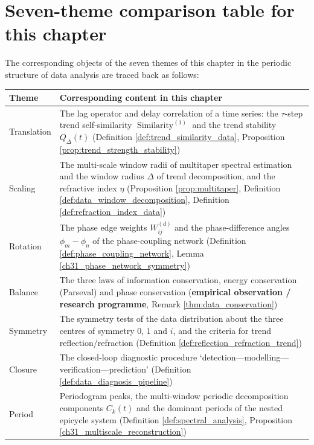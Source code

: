 \section*{Seven-theme comparison table for this chapter}
The corresponding objects of the seven themes of this chapter in the periodic structure of data analysis are traced back as follows:
\begin{center}
\begin{tabular}{>{\centering\arraybackslash}p{2.8cm}>{\centering\arraybackslash}p{8.9cm}}
\toprule
Theme & Corresponding content in this chapter \\
\midrule
Translation & The lag operator and delay correlation of a time series: the $\tau$-step trend self-similarity $\operatorname{Similarity}^{(1)}$ and the trend stability $Q_\Delta(t)$ (Definition \ref{def:trend_similarity_data}, Proposition \ref{prop:trend_strength_stability}) \\
Scaling & The multi-scale window radii of multitaper spectral estimation and the window radius $\Delta$ of trend decomposition, and the refractive index $\eta$ (Proposition \ref{prop:multitaper}, Definition \ref{def:data_window_decomposition}, Definition \ref{def:refraction_index_data}) \\
Rotation & The phase edge weights $W_{ij}^{(d)}$ and the phase-difference angles $\phi_m-\phi_n$ of the phase-coupling network (Definition \ref{def:phase_coupling_network}, Lemma \ref{ch31_phase_network_symmetry}) \\
Balance & The three laws of information conservation, energy conservation (Parseval) and phase conservation (\textbf{empirical observation / research programme}, Remark \ref{thm:data_conservation}) \\
Symmetry & The symmetry tests of the data distribution about the three centres of symmetry $0$, $1$ and $i$, and the criteria for trend reflection/refraction (Definition \ref{def:reflection_refraction_trend}) \\
Closure & The closed-loop diagnostic procedure `detection---modelling---verification---prediction' (Definition \ref{def:data_diagnosis_pipeline}) \\
Period & Periodogram peaks, the multi-window periodic decomposition components $C_k(t)$ and the dominant periods of the nested epicycle system (Definition \ref{def:spectral_analysis}, Proposition \ref{ch31_multiscale_reconstruction}) \\
\bottomrule
\end{tabular}
\end{center}

